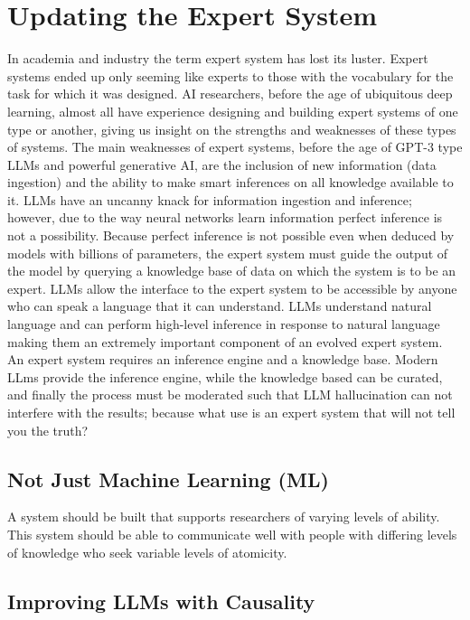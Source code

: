 \section{Updating the Expert System}
In academia and industry the term expert system has lost its luster.
Expert systems ended up only seeming like experts to those with the vocabulary for the task for which it was designed.
AI researchers, before the age of ubiquitous deep learning, almost all have experience designing and building expert systems of one type or another, giving us insight on the strengths and weaknesses of these types of systems.
The main weaknesses of expert systems, before the age of GPT-3 type LLMs and powerful generative AI, are the inclusion of new information (data ingestion) and the ability to make smart inferences on all knowledge available to it.
LLMs have an uncanny knack for information ingestion and inference; however, due to the way neural networks learn information perfect inference is not a possibility.
Because perfect inference is not possible even when deduced by models with billions of parameters, the expert system must guide the output of the model by querying a knowledge base of data on which the system is to be an expert.
LLMs allow the interface to the expert system to be accessible by anyone who can speak a language that it can understand.
LLMs understand natural language and can perform high-level inference in response to natural language making them an extremely important component of an evolved expert system.
An expert system requires an inference engine and a knowledge base.
Modern LLms provide the inference engine, while the knowledge based can be curated, and finally the process must be moderated such that LLM hallucination can not interfere with the results; because what use is an expert system that will not tell you the truth?

\subsection{Not Just Machine Learning (ML)}

A system should be built that supports researchers of varying levels of ability.
This system should be able to communicate well with people with differing levels of knowledge who seek variable levels of atomicity.

\subsection{Improving LLMs with Causality} %

